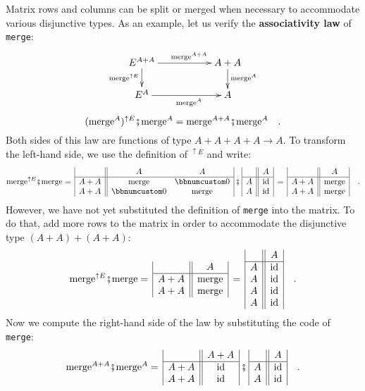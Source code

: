 Matrix rows and columns can be split or merged when necessary to accommodate
various disjunctive types. As an example, let us verify the \textbf{associativity
law} of \lstinline!merge!:
\[
\xymatrix{\xyScaleY{1.5pc}\xyScaleX{4.5pc}E^{A+A}\ar[d]\sb(0.45){\text{merge}^{\uparrow E}}\ar[r]\sp(0.55){\text{merge}^{A+A}} & A+A\ar[d]\sp(0.45){\text{merge}^{A}}\\
E^{A}\ar[r]\sb(0.55){\text{merge}^{A}} & A
}
\]
\[
(\text{merge}^{A})^{\uparrow E}\bef\text{merge}^{A}=\text{merge}^{A+A}\bef\text{merge}^{A}\quad.
\]
Both sides of this law are functions of type $A+A+A+A\rightarrow A$.
To transform the left-hand side, we use the definition of $^{\uparrow E}$
and write:
\[
\text{merge}^{\uparrow E}\bef\text{merge}=\,\begin{array}{|c||cc|}
 & A & A\\
\hline A+A & \text{merge} & \bbnum 0\\
A+A & \bbnum 0 & \text{merge}
\end{array}\,\bef\,\begin{array}{|c||c|}
 & A\\
\hline A & \text{id}\\
A & \text{id}
\end{array}\,=\,\begin{array}{|c||c|}
 & A\\
\hline A+A & \text{merge}\\
A+A & \text{merge}
\end{array}\quad.
\]
However, we have not yet substituted the definition of \lstinline!merge!
into the matrix. To do that, add more rows to the matrix in order
to accommodate the disjunctive type $(A+A)+(A+A)$:
\[
\text{merge}^{\uparrow E}\bef\text{merge}=\,\begin{array}{|c||c|}
 & A\\
\hline A+A & \text{merge}\\
A+A & \text{merge}
\end{array}\,=\,\begin{array}{|c||c|}
 & A\\
\hline A & \text{id}\\
A & \text{id}\\
A & \text{id}\\
A & \text{id}
\end{array}\quad.
\]
Now we compute the right-hand side of the law by substituting the
code of \lstinline!merge!:
\[
\text{merge}^{A+A}\bef\text{merge}^{A}=\,\begin{array}{|c||c|}
 & A+A\\
\hline A+A & \text{id}\\
A+A & \text{id}
\end{array}\,\bef\,\begin{array}{|c||c|}
 & A\\
\hline A & \text{id}\\
A & \text{id}
\end{array}\quad.
\]
